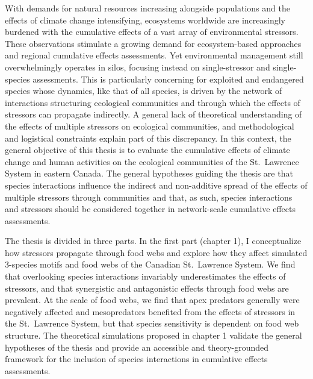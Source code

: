 With demands for natural resources increasing alongside populations and
the effects of climate change intensifying, ecosystems worldwide are
increasingly burdened with the cumulative effects of a vast array of
environmental stressors. These observations stimulate a growing demand
for ecosystem-based approaches and regional cumulative effects
assessments. Yet environmental management still overwhelmingly operates
in silos, focusing instead on single-stressor and single-species
assessments. This is particularly concerning for exploited and
endangered species whose dynamics, like that of all species, is driven
by the network of interactions structuring ecological communities and
through which the effects of stressors can propagate indirectly. A
general lack of theoretical understanding of the effects of multiple
stressors on ecological communities, and methodological and logistical
constraints explain part of this discrepancy. In this context, the
general objective of this thesis is to evaluate the cumulative effects
of climate change and human activities on the ecological communities of
the St.~Lawrence System in eastern Canada. The general hypotheses
guiding the thesis are that species interactions influence the indirect
and non-additive spread of the effects of multiple stressors through
communities and that, as such, species interactions and stressors should
be considered together in network-scale cumulative effects assessments.

The thesis is divided in three parts. In the first part (chapter 1), I
conceptualize how stressors propagate through food webs and explore how
they affect simulated 3-species motifs and food webs of the Canadian
St.~Lawrence System. We find that overlooking species interactions
invariably underestimates the effects of stressors, and that synergistic
and antagonistic effects through food webs are prevalent. At the scale
of food webs, we find that apex predators generally were negatively
affected and mesopredators benefited from the effects of stressors in
the St.~Lawrence System, but that species sensitivity is dependent on
food web structure. The theoretical simulations proposed in chapter 1
validate the general hypotheses of the thesis and provide an accessible
and theory-grounded framework for the inclusion of species interactions
in cumulative effects assessments.

